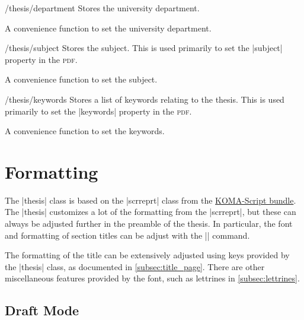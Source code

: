 \begin{key}{/thesis/department}
  Stores the university department.

  \begin{command}{\department{}}
    A convenience function to set the university department.
  \end{command}
\end{key}

\begin{key}{/thesis/subject}
  Stores the subject.  This is used primarily to set the |subject| property in
  the \textsc{pdf}.

  \begin{command}{\subject{}}
    A convenience function to set the subject.
  \end{command}
\end{key}

\begin{key}{/thesis/keywords}
  Stores a list of keywords relating to the thesis.  This is used primarily to
  set the |keywords| property in the \textsc{pdf}.

  \begin{command}{\keywords{}}
    A convenience function to set the keywords.
  \end{command}
\end{key}


\section{Formatting}
\label{sec:formatting}

The |thesis| class is based on the |scrreprt| class from the
\href{https://www.ctan.org/pkg/koma-script}{KOMA-Script bundle}.  The |thesis|
customizes a lot of the formatting from the |scrreprt|, but these can always be
adjusted further in the preamble of the thesis.  In particular, the font and
formatting of section titles can be adjust with the |\setkomafont| command.

The formatting of the title can be extensively adjusted using keys provided by
the |thesis| class, as documented in \cref{subsec:title_page}.  There are other
miscellaneous features provided by the font, such as lettrines in
\cref{subsec:lettrines}.

\subsection{Draft Mode}
\label{subsec:draft_mode}

